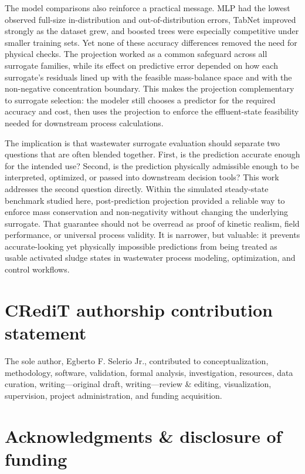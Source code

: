 \documentclass[a4paper,fleqn]{cas-sc}
\begin{document}
The model comparisons also reinforce a practical message. MLP had the lowest observed full-size in-distribution and out-of-distribution errors, TabNet improved strongly as the dataset grew, and boosted trees were especially competitive under smaller training sets. Yet none of these accuracy differences removed the need for physical checks. The projection worked as a common safeguard across all surrogate families, while its effect on predictive error depended on how each surrogate's residuals lined up with the feasible mass-balance space and with the non-negative concentration boundary. This makes the projection complementary to surrogate selection: the modeler still chooses a predictor for the required accuracy and cost, then uses the projection to enforce the effluent-state feasibility needed for downstream process calculations.

The implication is that wastewater surrogate evaluation should separate two questions that are often blended together. First, is the prediction accurate enough for the intended use? Second, is the prediction physically admissible enough to be interpreted, optimized, or passed into downstream decision tools? This work addresses the second question directly. Within the simulated steady-state benchmark studied here, post-prediction projection provided a reliable way to enforce mass conservation and non-negativity without changing the underlying surrogate. That guarantee should not be overread as proof of kinetic realism, field performance, or universal process validity. It is narrower, but valuable: it prevents accurate-looking yet physically impossible predictions from being treated as usable activated sludge states in wastewater process modeling, optimization, and control workflows.

\section*{CRediT authorship contribution statement}

The sole author, Egberto F. Selerio Jr., contributed to conceptualization, methodology, software, validation, formal analysis, investigation, resources, data curation, writing---original draft, writing---review \& editing, visualization, supervision, project administration, and funding acquisition.

\section*{Acknowledgments \& disclosure of funding}
\end{document}
